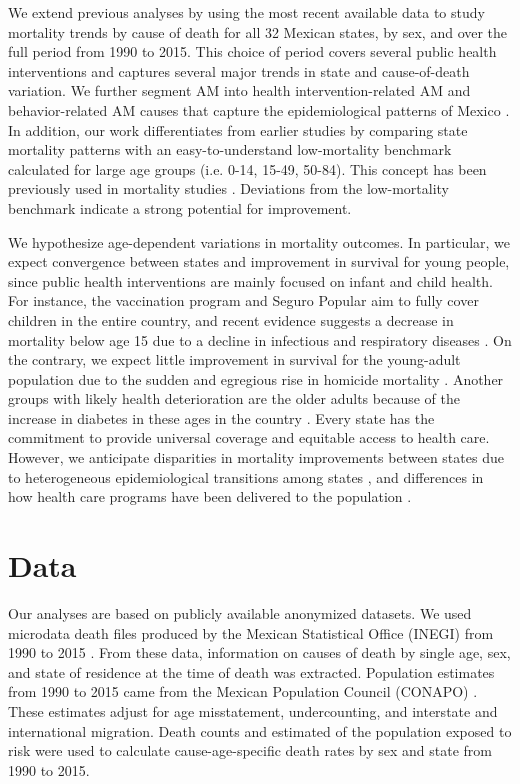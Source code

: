 \documentclass{bmcart}
\begin{document}
We extend previous analyses by using the most recent available data to study mortality trends by cause of death for all 32 Mexican states, by sex, and over the full period from 1990 to 2015. This choice of period covers several public health interventions and captures several major trends in state and cause-of-death variation. We further segment AM into health intervention-related AM and
behavior-related AM causes that capture the epidemiological patterns of Mexico \cite{Aburto2015}. In addition, our work differentiates from earlier studies by comparing state mortality patterns with an easy-to-understand low-mortality benchmark calculated for large age groups (i.e. 0-14, 15-49, 50-84). This concept has been previously used in mortality studies \cite{whelpton1947,wunsch1975minimum,vallin2008minimum}. Deviations from the low-mortality benchmark indicate a strong potential for improvement.

We hypothesize age-dependent variations in mortality outcomes.
In particular, we expect convergence between states and improvement in survival
for young people, since public health interventions are mainly focused on infant and child health. For instance, the vaccination program and Seguro Popular aim to fully cover children in the entire country, and recent
evidence suggests a decrease in mortality below age 15 due to a decline
in infectious and respiratory diseases \cite{gonzalez2016mexico}. On the contrary, we
expect little improvement in survival for the young-adult population due to the sudden and egregious rise in homicide mortality \cite{gamlin2015violence}. Another groups with likely health deterioration are the older adults because of the increase in diabetes in these ages in the country \cite{gonzalez2016mexico}. Every
state has the commitment to provide universal coverage and equitable access to
health care. However, we anticipate disparities in mortality improvements between states due to heterogeneous epidemiological transitions among states \cite{gomez2016dissonant}, and differences in how  health care programs have been delivered to the population
\cite{Frenk2006}.


\section*{Data} 
Our analyses are based on publicly available anonymized datasets. We used microdata death files produced by the
Mexican Statistical Office (INEGI) from 1990 to 2015 \cite{INEGI}. From these data, 
information on causes of death by single age, sex, and state of residence at the
time of death was extracted. Population estimates from 1990 to 2015 came from the Mexican Population Council (CONAPO) \cite{CONAPO}. These estimates adjust for age misstatement, undercounting, and interstate and international migration. Death counts and estimated of the population exposed to risk were used to calculate cause-age-specific death rates by sex and state from 1990 to 2015.
\end{document}
